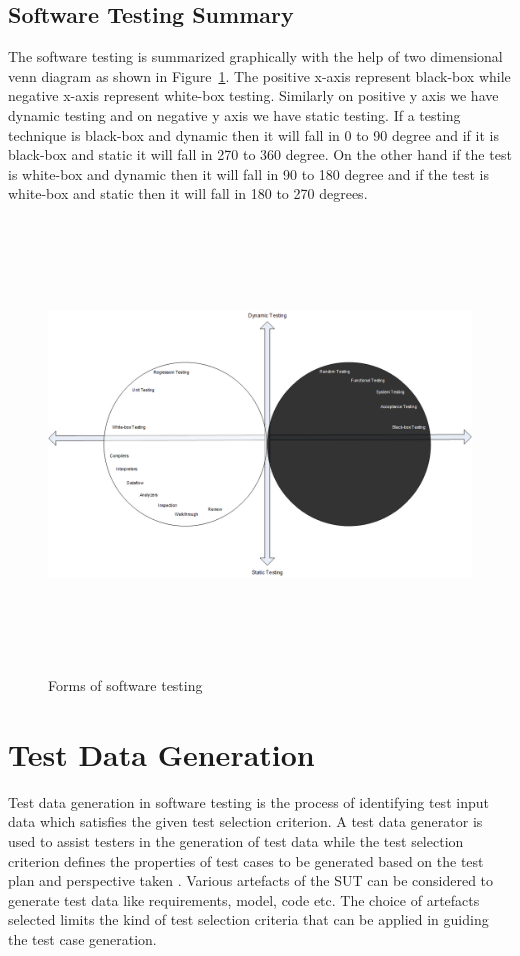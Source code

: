 \subsection{Software Testing Summary}
The software testing is summarized graphically with the help of two dimensional venn diagram as shown in Figure~\ref{fig:testDataGenerators_2}. The positive x-axis represent black-box while negative x-axis represent white-box testing. Similarly on positive y axis we have dynamic testing and on negative y axis we have static testing. If a testing technique is black-box and dynamic then it will fall in 0 to 90 degree and if it is black-box and static it will fall in 270 to 360 degree. On the other hand if the test is white-box and dynamic then it will fall in 90 to 180 degree and if the test is white-box and static then it will fall in 180 to 270 degrees.
\bigskip
\begin{figure}[h]
	\centering
	\centerline{\includegraphics[width=16cm, height=12cm ]{chapter2/DrawingTesting.png}}
	\caption{Forms of software testing}
	\label{fig:testDataGenerators_2}
\end{figure}



\section{Test Data Generation}
Test data generation in software testing is the process of identifying test input data which satisfies the given test selection criterion. A test data generator is used to assist testers in the generation of test data while the test selection criterion defines the properties of test cases to be generated based on the test plan and perspective taken \cite{korel1990automated}. Various artefacts of the SUT can be considered to generate test data like requirements, model, code etc. The choice of artefacts selected limits the kind of test selection criteria that can be applied in guiding the test case generation. 

